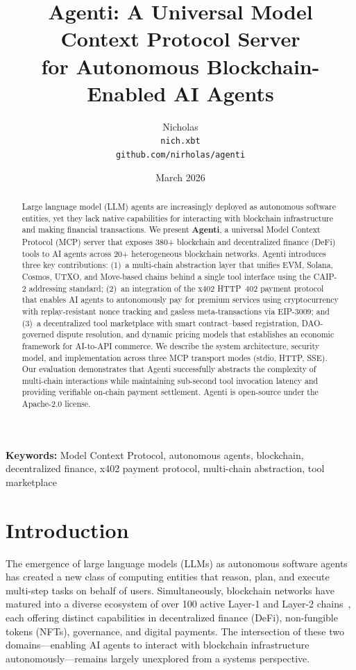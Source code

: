 \documentclass[11pt]{article}
\title{%
  \textbf{Agenti: A Universal Model Context Protocol Server \\
  for Autonomous Blockchain-Enabled AI Agents}
}
\author{
  Nicholas\\
  \texttt{nich.xbt}\\
  \texttt{github.com/nirholas/agenti}
}
\date{March 2026}
\begin{document}
\maketitle

\begin{abstract}
Large language model (LLM) agents are increasingly deployed as autonomous software entities, yet they lack native capabilities for interacting with blockchain infrastructure and making financial transactions. We present \textbf{Agenti}, a universal Model Context Protocol (MCP) server that exposes 380+ blockchain and decentralized finance (DeFi) tools to AI agents across 20+ heterogeneous blockchain networks. Agenti introduces three key contributions: (1)~a multi-chain abstraction layer that unifies EVM, Solana, Cosmos, UTXO, and Move-based chains behind a single tool interface using the CAIP-2 addressing standard; (2)~an integration of the x402 HTTP~402 payment protocol that enables AI agents to autonomously pay for premium services using cryptocurrency with replay-resistant nonce tracking and gasless meta-transactions via EIP-3009; and (3)~a decentralized tool marketplace with smart contract--based registration, DAO-governed dispute resolution, and dynamic pricing models that establishes an economic framework for AI-to-API commerce. We describe the system architecture, security model, and implementation across three MCP transport modes (stdio, HTTP, SSE). Our evaluation demonstrates that Agenti successfully abstracts the complexity of multi-chain interactions while maintaining sub-second tool invocation latency and providing verifiable on-chain payment settlement. Agenti is open-source under the Apache-2.0 license.
\end{abstract}

\noindent\textbf{Keywords:} Model Context Protocol, autonomous agents, blockchain, decentralized finance, x402 payment protocol, multi-chain abstraction, tool marketplace

\section{Introduction}
\label{sec:introduction}

The emergence of large language models (LLMs) as autonomous software agents~\cite{yao2023react,schick2023toolformer} has created a new class of computing entities that reason, plan, and execute multi-step tasks on behalf of users. Simultaneously, blockchain networks have matured into a diverse ecosystem of over 100 active Layer-1 and Layer-2 chains~\cite{defillama2024}, each offering distinct capabilities in decentralized finance (DeFi), non-fungible tokens (NFTs), governance, and digital payments. The intersection of these two domains---enabling AI agents to interact with blockchain infrastructure autonomously---remains largely unexplored from a systems perspective.
\end{document}
